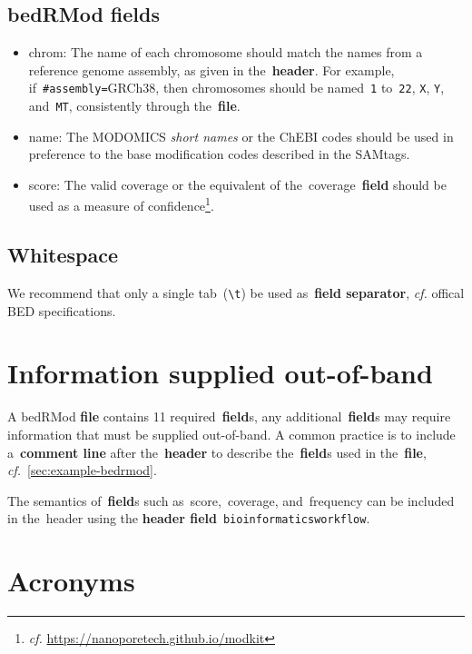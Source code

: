 \documentclass[11pt]{article}
\begin{document}
\subsection{\acs{bedRMod} fields}
\begin{itemize}
\item \textsf{chrom}: The name of each chromosome should match the names from a reference genome assembly, as given in the~\textbf{header}.
  For example, if~\texttt{\#assembly=}GRCh38, then chromosomes should be named~\texttt{1} to~\texttt{22}, \texttt{X}, \texttt{Y}, and~\texttt{MT},
  consistently through the~\textbf{file}.
\item \textsf{name}: The MODOMICS \emph{short names} or the ChEBI codes should be used in preference to the base modification codes described in the SAMtags.
\item \textsf{score}: The valid coverage or the equivalent of the~\textsf{coverage}~\textbf{field} should be used as a measure of confidence\footnote{\textit{cf.} \url{https://nanoporetech.github.io/modkit}}.
\end{itemize}

\subsection{Whitespace}\label{sec:whitespace}
We recommend that only a single tab~(\texttt{{\textbackslash}t}) be used as~\textbf{field separator}, \textit{cf.} offical \ac{BED} specifications.

\section{Information supplied out-of-band}

A \ac{bedRMod} \textbf{file} contains 11 required~\textbf{field}s, any additional~\textbf{field}s may require information that must be supplied out-of-band.
A common practice is to include a~\textbf{comment line} after the~\textbf{header} to describe the~\textbf{field}s used in the~\textbf{file}, \textit{cf.}~\autoref{sec:example-bedrmod}.

The semantics of~\textbf{field}s such as~\textsf{score},~\textsf{coverage}, and~\textsf{frequency} can be included in the~\textsf{header} using the \textbf{header field}~\texttt{bioinformatics\textunderscore workflow}.

\section{Acronyms}
\end{document}
